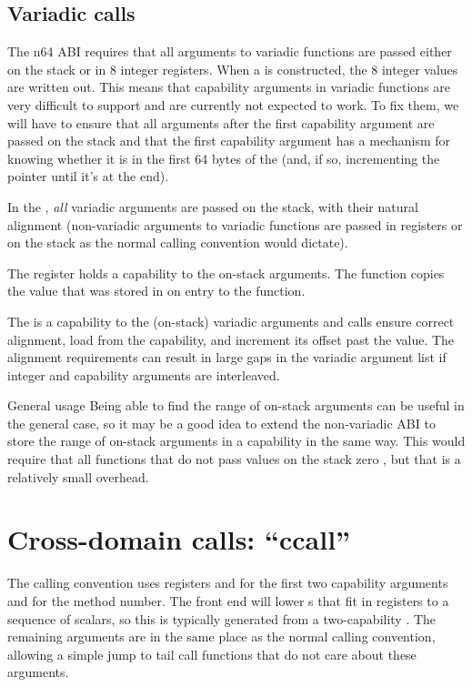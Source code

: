 \subsection{Variadic calls}

The n64 ABI requires that all arguments to variadic functions are passed either on the stack or in 8 integer registers.
When a  is constructed, the 8 integer values are written out.
This means that capability arguments in variadic functions are very difficult to support and are currently not expected to work.
To fix them, we will have to ensure that all arguments after the first capability argument are passed on the stack and that the first capability argument has a mechanism for knowing whether it is in the first 64 bytes of the  (and, if so, incrementing the pointer until it's at the end).

In the \sandboxABI{}, \textit{all} variadic arguments are passed on the stack, with their natural alignment (non-variadic arguments to variadic functions are passed in registers or on the stack as the normal calling convention would dictate).

The  register holds a capability to the on-stack arguments.
The  function copies the value that was stored in  on entry to the function.

The  is a capability to the (on-stack) variadic arguments and  calls ensure correct alignment, load from the capability, and increment its offset past the value.
The alignment requirements can result in large gaps in the variadic argument list if integer and capability arguments are interleaved.

\begin{notebox}{General usage}
	Being able to find the range of on-stack arguments can be useful in the general case, so it may be a good idea to extend the non-variadic ABI to store the range of on-stack arguments in a capability in the same way.
	This would require that all functions that do not pass values on the stack zero , but that is a relatively small overhead.
\end{notebox}

\section{Cross-domain calls: ``ccall''}

The  calling convention uses registers  and  for the first two capability arguments and  for the method number.
The front end will lower s that fit in registers to a sequence of scalars, so this is typically generated from a two-capability .
The remaining arguments are in the same place as the normal calling convention, allowing a simple jump to tail call functions that do not care about these arguments.

